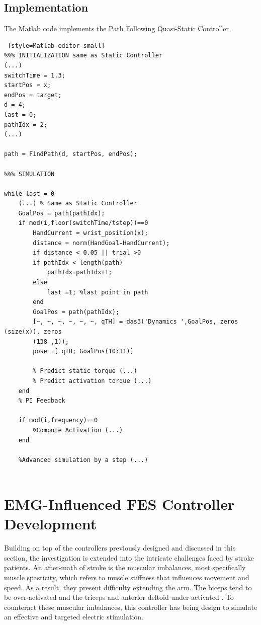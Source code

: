 \subsection{Implementation}
The Matlab code implements the Path Following Quasi-Static Controller . 

\begin{lstlisting} [style=Matlab-editor-small]
%%% INITIALIZATION same as Static Controller 
(...)
switchTime = 1.3;
startPos = x; 
endPos = target;
d = 4; 
last = 0;
pathIdx = 2;
(...)

path = FindPath(d, startPos, endPos);

%%% SIMULATION 

while last = 0
    (...) % Same as Static Controller
    GoalPos = path(pathIdx);
    if mod(i,floor(switchTime/tstep))==0
        HandCurrent = wrist_position(x);
        distance = norm(HandGoal-HandCurrent);
        if distance < 0.05 || trial >0 
        if pathIdx < length(path)
            pathIdx=pathIdx+1;
        else 
            last =1; %last point in path
        end
        GoalPos = path(pathIdx);
        [~, ~, ~, ~, ~, ~, qTH] = das3('Dynamics ',GoalPos, zeros (size(x)), zeros
        (138 ,1));
        pose =[ qTH; GoalPos(10:11)]
        
        % Predict static torque (...)
        % Predict activation torque (...)
    end
    % PI Feedback

    if mod(i,frequency)==0
        %Compute Activation (...)
    end

    %Advanced simulation by a step (...)
    
\end{lstlisting}


\newpage
\section{EMG-Influenced FES Controller Development}

Building on top of the controllers previously designed and discussed in this section, the investigation is extended into the intricate challenges faced by stroke patients. An after-math of stroke is the muscular imbalances, most specifically muscle spasticity, which refers to muscle stiffness that influences movement and speed. As a result, they present difficulty extending the arm. The biceps tend to be over-activated and the triceps and anterior deltoid under-activated \cite{IOL}. To counteract these muscular imbalances, this controller has being design to simulate an effective and targeted electric stimulation. 

